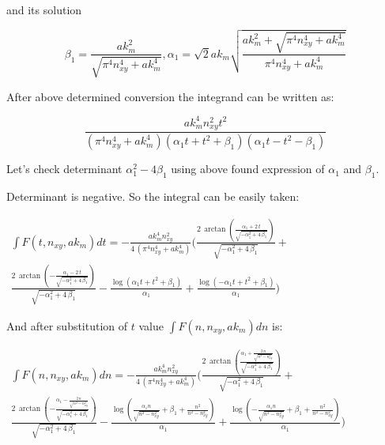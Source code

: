 \documentclass[11pt]{article}
\begin{document}
and its solution

\[\beta_{1} = \frac{\mathit{ak}_{m}^{2}}{\sqrt{\pi^{4} n_{\mathit{xy}}^{4} + \mathit{ak}_{m}^{4}}}, \alpha_{1} = \sqrt{2} \mathit{ak}_{m} \sqrt{\frac{\mathit{ak}_{m}^{2} + \sqrt{\pi^{4} n_{\mathit{xy}}^{4} + \mathit{ak}_{m}^{4}}}{\pi^{4} n_{\mathit{xy}}^{4} + \mathit{ak}_{m}^{4}}}\]

    After above determined conversion the integrand can be written as:

    \[\frac{\mathit{ak}_{m}^{4} n_{\mathit{xy}}^{2} t^{2}}{{\left(\pi^{4} n_{\mathit{xy}}^{4} + \mathit{ak}_{m}^{4}\right)} {\left(\alpha_{1} t + t^{2} + \beta_{1}\right)} {\left(\alpha_{1} t - t^{2} - \beta_{1}\right)}}\]

    Let's check determinant \(\alpha_1^2 - 4\beta_1\) using above found
expression of \(\alpha_1\) and \(\beta_1\).

    Determinant is negative. So the integral can be easily taken:

    \(\begin{array}{r} \int F\left(t, n_{xy}, ak_m\right) dt = -\frac{\mathit{ak}_{m}^{4} n_{\mathit{xy}}^{2}}{4 \, {\left(\pi^{4} n_{\mathit{xy}}^{4} + \mathit{ak}_{m}^{4}\right)}} \Bigg(\frac{2 \, \arctan\left(\frac{\alpha_{1} + 2 \, t}{\sqrt{-\alpha_{1}^{2} + 4 \, \beta_{1}}}\right)}{\sqrt{-\alpha_{1}^{2} + 4 \, \beta_{1}}} + \\ \frac{2 \, \arctan\left(-\frac{\alpha_{1} - 2 \, t}{\sqrt{-\alpha_{1}^{2} + 4 \, \beta_{1}}}\right)}{\sqrt{-\alpha_{1}^{2} + 4 \, \beta_{1}}} - \frac{\log\left(\alpha_{1} t + t^{2} + \beta_{1}\right)}{\alpha_{1}} + \frac{\log\left(-\alpha_{1} t + t^{2} + \beta_{1}\right)}{\alpha_{1}}\Bigg) \end{array}\)

    And after substitution of \(t\) value
\(\int F\left(n, n_{xy}, ak_m\right) dn\) is:

    \(\begin{array}{r} \int F\left(n, n_{xy}, ak_m\right) dn = -\frac{\mathit{ak}_{m}^{4} n_{\mathit{xy}}^{2}}{4 \, {\left(\pi^{4} n_{\mathit{xy}}^{4} + \mathit{ak}_{m}^{4}\right)}} \Bigg(\frac{2 \, \arctan\left(\frac{\alpha_{1} + \frac{2 \, n}{\sqrt{n^{2} - n_{\mathit{xy}}^{2}}}}{\sqrt{-\alpha_{1}^{2} + 4 \, \beta_{1}}}\right)}{\sqrt{-\alpha_{1}^{2} + 4 \, \beta_{1}}} + \\ \frac{2 \, \arctan\left(-\frac{\alpha_{1} - \frac{2 \, n}{\sqrt{n^{2} - n_{\mathit{xy}}^{2}}}}{\sqrt{-\alpha_{1}^{2} + 4 \, \beta_{1}}}\right)}{\sqrt{-\alpha_{1}^{2} + 4 \, \beta_{1}}} - \frac{\log\left(\frac{\alpha_{1} n}{\sqrt{n^{2} - n_{\mathit{xy}}^{2}}} + \beta_{1} + \frac{n^{2}}{n^{2} - n_{\mathit{xy}}^{2}}\right)}{\alpha_{1}} + \frac{\log\left(-\frac{\alpha_{1} n}{\sqrt{n^{2} - n_{\mathit{xy}}^{2}}} + \beta_{1} + \frac{n^{2}}{n^{2} - n_{\mathit{xy}}^{2}}\right)}{\alpha_{1}}\Bigg) \end{array}\)
\end{document}
